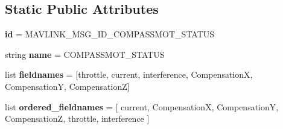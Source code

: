 \subsection*{Static Public Attributes}
\begin{DoxyCompactItemize}
\item 
\mbox{\label{classpymavlink_1_1dialects_1_1v10_1_1MAVLink__compassmot__status__message_a7933edb76571ea3d5c3d80bf3efcb951}} 
{\bfseries id} = M\+A\+V\+L\+I\+N\+K\+\_\+\+M\+S\+G\+\_\+\+I\+D\+\_\+\+C\+O\+M\+P\+A\+S\+S\+M\+O\+T\+\_\+\+S\+T\+A\+T\+US
\item 
\mbox{\label{classpymavlink_1_1dialects_1_1v10_1_1MAVLink__compassmot__status__message_a5d27108967519398f4c3a9500af980ba}} 
string {\bfseries name} = \textquotesingle{}C\+O\+M\+P\+A\+S\+S\+M\+O\+T\+\_\+\+S\+T\+A\+T\+US\textquotesingle{}
\item 
\mbox{\label{classpymavlink_1_1dialects_1_1v10_1_1MAVLink__compassmot__status__message_a4f8f06d987a406cd0f284794234be86e}} 
list {\bfseries fieldnames} = \mbox{[}\textquotesingle{}throttle\textquotesingle{}, \textquotesingle{}current\textquotesingle{}, \textquotesingle{}interference\textquotesingle{}, \textquotesingle{}CompensationX\textquotesingle{}, \textquotesingle{}CompensationY\textquotesingle{}, \textquotesingle{}CompensationZ\textquotesingle{}\mbox{]}
\item 
\mbox{\label{classpymavlink_1_1dialects_1_1v10_1_1MAVLink__compassmot__status__message_abab70763d318c5e488ade5f95d79489d}} 
list {\bfseries ordered\+\_\+fieldnames} = \mbox{[} \textquotesingle{}current\textquotesingle{}, \textquotesingle{}CompensationX\textquotesingle{}, \textquotesingle{}CompensationY\textquotesingle{}, \textquotesingle{}CompensationZ\textquotesingle{}, \textquotesingle{}throttle\textquotesingle{}, \textquotesingle{}interference\textquotesingle{} \mbox{]}
\item 
\mbox{\label{classpymavlink_1_1dialects_1_1v10_1_1MAVLink__compassmot__status__message_a8023dab6f5597aa92473b5334edded59}} 

\end{DoxyCompactItemize}
